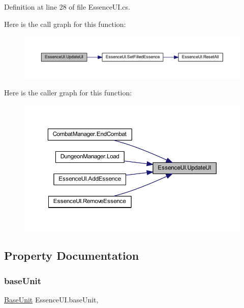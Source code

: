 Definition at line 28 of file Essence\+U\+I.\+cs.

Here is the call graph for this function\+:
\nopagebreak
\begin{figure}[H]
\begin{center}
\leavevmode
\includegraphics[width=350pt]{class_essence_u_i_a26023c3d4977188014384a1a40eb3ad9_cgraph}
\end{center}
\end{figure}
Here is the caller graph for this function\+:
\nopagebreak
\begin{figure}[H]
\begin{center}
\leavevmode
\includegraphics[width=350pt]{class_essence_u_i_a26023c3d4977188014384a1a40eb3ad9_icgraph}
\end{center}
\end{figure}


\subsection{Property Documentation}
\mbox{\label{class_essence_u_i_aa0f4e2e07a1b90d6656dbbbf34a459fe}} 
\subsubsection{\texorpdfstring{baseUnit}{baseUnit}}
{\footnotesize\ttfamily \mbox{\hyperlink{class_base_unit}{Base\+Unit}} Essence\+U\+I.\+base\+Unit\hspace{0.3cm}{\ttfamily [get]}, {\ttfamily [set]}}



